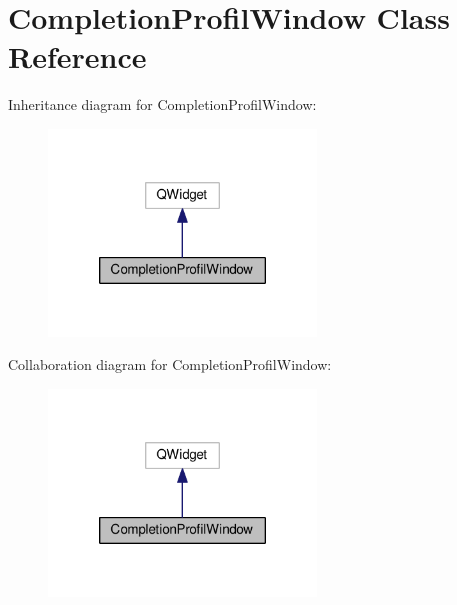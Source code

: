 \hypertarget{class_completion_profil_window}{\section{Completion\-Profil\-Window Class Reference}
\label{class_completion_profil_window}
}


Inheritance diagram for Completion\-Profil\-Window\-:
\nopagebreak
\begin{figure}[H]
\begin{center}
\leavevmode
\includegraphics[width=202pt]{class_completion_profil_window__inherit__graph}
\end{center}
\end{figure}


Collaboration diagram for Completion\-Profil\-Window\-:
\nopagebreak
\begin{figure}[H]
\begin{center}
\leavevmode
\includegraphics[width=202pt]{class_completion_profil_window__coll__graph}
\end{center}
\end{figure}

